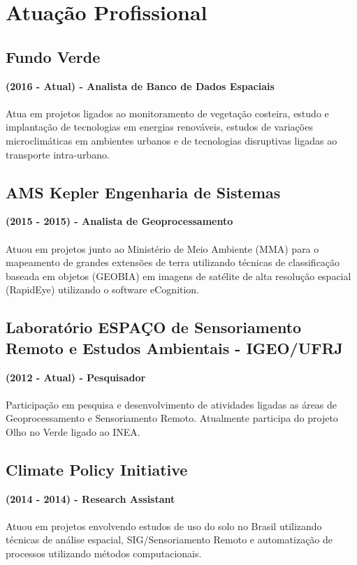 \documentclass{article}
\begin{document}

\section{Atuação Profissional}
\subsection{Fundo Verde}
\textbf{(2016 - Atual) - Analista de Banco de Dados Espaciais} \\ \\
Atua em projetos ligados ao monitoramento de vegetação costeira, estudo e implantação de tecnologias em energias renováveis, estudos de variações microclimáticas em ambientes urbanos e de tecnologias disruptivas ligadas ao transporte intra-urbano.

\subsection{AMS Kepler Engenharia de Sistemas}
\textbf{(2015 - 2015) - Analista de Geoprocessamento} \\ \\
Atuou em projetos junto ao Ministério de Meio Ambiente (MMA) para o mapeamento de grandes extensões de terra utilizando técnicas de classificação baseada em objetos (GEOBIA) em imagens de satélite de alta resolução espacial (RapidEye) utilizando o software eCognition.

\subsection{Laboratório ESPAÇO de Sensoriamento Remoto e Estudos Ambientais - IGEO/UFRJ}
\textbf{(2012 - Atual) - Pesquisador} \\ \\
Participação em pesquisa e desenvolvimento de atividades ligadas as áreas de Geoprocessamento e Sensoriamento Remoto. Atualmente participa do projeto Olho no Verde ligado ao INEA.

\subsection{Climate Policy Initiative}
\textbf{(2014 - 2014) - Research Assistant} \\ \\
Atuou em projetos envolvendo estudos de uso do solo no Brasil utilizando técnicas de análise espacial, SIG/Sensoriamento Remoto e automatização de processos utilizando métodos computacionais.
\end{document}
